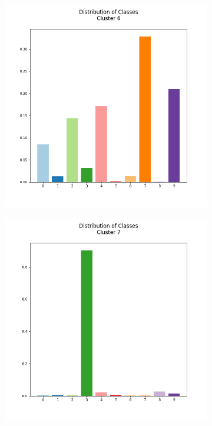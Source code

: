 \documentclass[12pt, a4paper]{article}
\begin{document}
\begin{figure}[h]
\begin{subfigure}{0.3\linewidth}
    \end{subfigure}
    \newline
    \begin{subfigure}{0.3\linewidth}
        \centering
        \includegraphics[scale=0.15]{images/q4/g/cluster6.png}
    \end{subfigure}
    \hfill
    \begin{subfigure}{0.3\linewidth}
        \centering
        \includegraphics[scale=0.15]{images/q4/g/cluster7.png}

\end{subfigure}
\end{figure}
\end{document}
